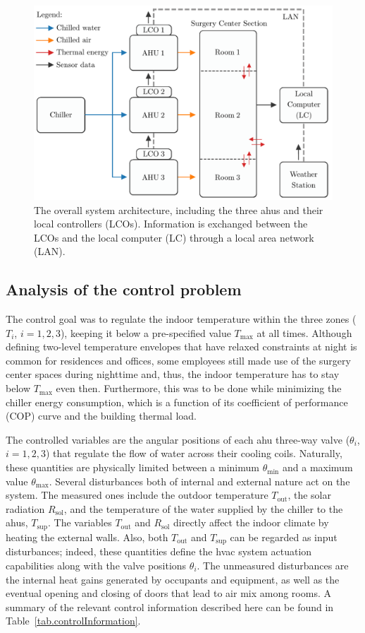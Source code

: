 \begin{figure}[!t]
	\centering
	\includegraphics[width=0.75\linewidth]{../images/chap3_sys_arch_diagram.pdf}
	\caption{The overall system architecture, including the three \acp{ahu} and their local controllers (LCOs). Information is exchanged between the LCOs and the local computer (LC) through a local area network (LAN).}
	\label{fig.blockDiagram}
\end{figure}

\subsection{Analysis of the control problem}
\label{sec.controlProb}

The control goal was to regulate the indoor temperature within the three zones ($T_i$, $i=1,2,3$), keeping it below a pre-specified value $T_{\text{max}}$ at all times. Although defining two-level temperature envelopes that have relaxed constraints at night is common for residences and offices, some employees still made use of the surgery center spaces during nighttime and, thus, the indoor temperature has to stay below $T_{\text{max}}$ even then. Furthermore, this was to be done while minimizing the chiller energy consumption, which is a function of its coefficient of performance (COP) curve and the building thermal load. 

The controlled variables are the angular positions of each \ac{ahu} three-way valve ($\theta_i$, $i=1,2,3$) that regulate the flow of water across their cooling coils. Naturally, these quantities are physically limited between a minimum $\theta_\text{min}$ and a maximum value $\theta_\text{max}$. Several disturbances both of internal and external nature act on the system. The measured ones include the outdoor temperature $T_\text{out}$, the solar radiation $R_\text{sol}$, and the temperature of the water supplied by the chiller to the \acp{ahu}, $T_\text{sup}$. The variables $T_\text{out}$ and $R_\text{sol}$ directly affect the indoor climate by heating the external walls. Also, both $T_\text{out}$ and $T_\text{sup}$ can be regarded as input disturbances; indeed, these quantities define the \ac{hvac} system actuation capabilities along with the valve positions $\theta_i$. The unmeasured disturbances are the internal heat gains generated by occupants and equipment, as well as the eventual opening and closing of doors that lead to air mix among rooms. A summary of the relevant control information described here can be found in Table~\ref{tab.controlInformation}.



